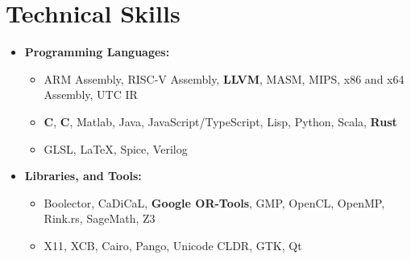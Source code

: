 \documentclass[10pt,letterpaper,sans]{moderncv}
\renewcommand{\_}{\textscale{.7}{\textunderscore}}
\newcommand{\Rplus}{\protect\hspace{-.1em}\protect\raisebox{.35ex}{\smaller{\smaller\textbf{+}}}}
\newcommand{\Cpp}{\mbox{C\Rplus\Rplus}\xspace}
\newcommand{\+}{%
  \raisebox{\dimexpr(\fontcharht\font`X-\height+\depth)/2\relax}{+}%
}
\begin{document}
\section{Technical Skills}
\begin{itemize}
\item \textbf{Programming Languages:}
  \begin{itemize}
  \item {} ARM Assembly, RISC-V Assembly, \textbf{LLVM}, MASM, MIPS, x86 and x64 Assembly, UTC IR
  \item {} \textbf{C}, \textbf{\Cpp}, Matlab, Java, JavaScript/TypeScript, Lisp, Python, Scala, \textbf{Rust}
  \item {} GLSL, \LaTeX, Spice, Verilog
  \end{itemize}
\item \textbf{Libraries, and Tools:} 
  \begin{itemize}
  \item {} Boolector, CaDiCaL, \textbf{Google OR-Tools}, GMP, OpenCL, OpenMP, Rink.rs, SageMath, Z3
  \item {} X11, XCB, Cairo, Pango, Unicode CLDR, GTK, Qt
  \end{itemize}
\end{itemize}

\vspace*{-4cm}
\end{document}
